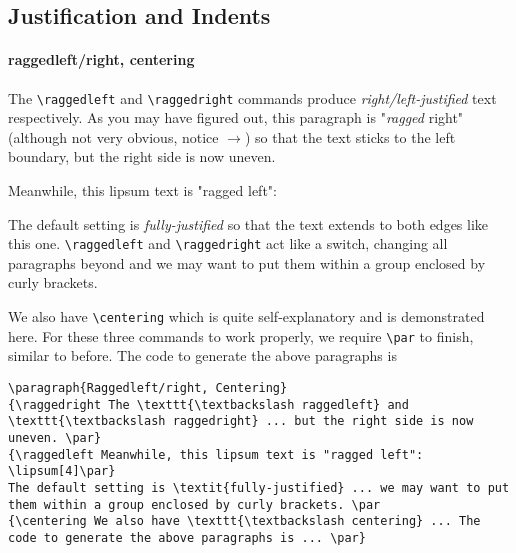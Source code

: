 \subsection{Justification and Indents}

\paragraph{raggedleft/right, centering}
{\raggedright The \texttt{\textbackslash raggedleft} and \texttt{\textbackslash raggedright} commands produce \textit{right/left-justified} text respectively. As you may have figured out, this paragraph is "\textit{ragged} right" (although not very obvious, notice $\rightarrow$) so that the text sticks to the left boundary, but the right side is now uneven. \par}
{\raggedleft Meanwhile, this lipsum text is "ragged left": \lipsum[4]\par}
The default setting is \textit{fully-justified} so that the text extends to both edges like this one. \texttt{\textbackslash raggedleft} and \texttt{\textbackslash raggedright} act like a switch, changing all paragraphs beyond and we may want to put them within a group enclosed by curly brackets. \par
{\centering We also have \texttt{\textbackslash centering} which is quite self-explanatory and is demonstrated here. For these three commands to work properly, we require \texttt{\textbackslash par} to finish, similar to before. The code to generate the above paragraphs is \par}
\begin{lstlisting}
\paragraph{Raggedleft/right, Centering}
{\raggedright The \texttt{\textbackslash raggedleft} and \texttt{\textbackslash raggedright} ... but the right side is now uneven. \par}
{\raggedleft Meanwhile, this lipsum text is "ragged left": \lipsum[4]\par}
The default setting is \textit{fully-justified} ... we may want to put them within a group enclosed by curly brackets. \par
{\centering We also have \texttt{\textbackslash centering} ... The code to generate the above paragraphs is ... \par}
\end{lstlisting}

